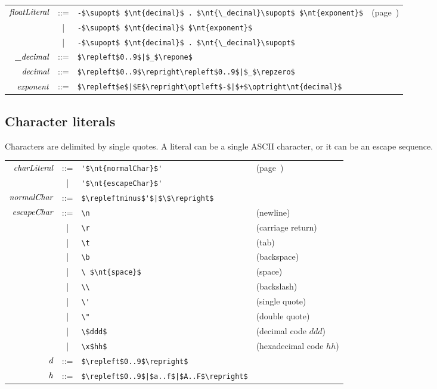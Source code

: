 \begin{center}
\begin{tabular}{rcll}
$\textit{\rmfamily floatLiteral}$ & ::= & \hbox{\lstinline/-$\supopt$ $\nt{decimal}$ . $\nt{\_decimal}\supopt$ $\nt{exponent}$/} & (page~\pageref{literal:float})\\
& | & \hbox{\lstinline/-$\supopt$ $\nt{decimal}$ $\nt{exponent}$/}\\
& | & \hbox{\lstinline/-$\supopt$ $\nt{decimal}$ . $\nt{\_decimal}\supopt$/}\\
$\textit{\rmfamily \_decimal}$ & ::= & \hbox{\lstinline/$\repleft$0..9$|$_$\repone$/}\\
$\textit{\rmfamily decimal}$ & ::= & \hbox{\lstinline/$\repleft$0..9$\repright\repleft$0..9$|$_$\repzero$/}\\
$\textit{\rmfamily exponent}$ & ::= & \hbox{\lstinline/$\repleft$e$|$E$\repright\optleft$-$|$+$\optright\nt{decimal}$/}
\end{tabular}
\end{center}

\subsection{Character literals}

Characters are delimited by single quotes.  A literal can be a single ASCII character, or it can be
an escape sequence.

\begin{center}
\begin{tabular}{rcll}
$\textit{\rmfamily charLiteral}$ & ::= & \hbox{\lstinline/'$\nt{normalChar}$'/} & (page~\pageref{literal:char})\\
& | & \hbox{\lstinline/'$\nt{escapeChar}$'/}\\
$\textit{\rmfamily normalChar}$ & ::= & \hbox{\lstinline/$\repleftminus$'$|$\$\repright$/}\\%
$\textit{\rmfamily escapeChar}$ & ::= & \hbox{\lstinline/\n/} & (newline)\\
& | & \hbox{\lstinline/\r/} & (carriage return)\\
& | & \hbox{\lstinline/\t/} & (tab)\\
& | & \hbox{\lstinline/\b/} & (backspace)\\
& | & \hbox{\lstinline/\ $\nt{space}$/} & (space)\\
& | & \hbox{\lstinline/\\/} & (backslash)\\
& | & \hbox{\lstinline/\'/} & (single quote)\\
& | & \hbox{\lstinline/\"/} & (double quote)\\
& | & \hbox{\lstinline/\$ddd$/} & (decimal code $ddd$)\\%
& | & \hbox{\lstinline/\x$hh$/}  & (hexadecimal code $hh$)\\
$\textit{\rmfamily d}$ & ::= & \hbox{\lstinline/$\repleft$0..9$\repright$/}\\
$\textit{\rmfamily h}$ & ::= & \hbox{\lstinline/$\repleft$0..9$|$a..f$|$A..F$\repright$/}
\end{tabular}
\end{center}

